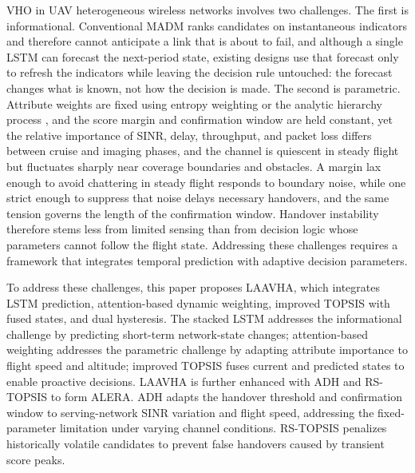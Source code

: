 \documentclass[preprint,12pt]{elsarticle}
\begin{document}
VHO in UAV heterogeneous wireless networks involves two challenges. The first is informational. Conventional MADM ranks candidates on instantaneous indicators and therefore cannot anticipate a link that is about to fail, and although a single LSTM can forecast the next-period state, existing designs use that forecast only to refresh the indicators while leaving the decision rule untouched: the forecast changes what is known, not how the decision is made. The second is parametric. Attribute weights are fixed using entropy weighting or the analytic hierarchy process \cite{ref12,ref13,ref14,ref15}, and the score margin and confirmation window are held constant, yet the relative importance of SINR, delay, throughput, and packet loss differs between cruise and imaging phases, and the channel is quiescent in steady flight but fluctuates sharply near coverage boundaries and obstacles. A margin lax enough to avoid chattering in steady flight responds to boundary noise, while one strict enough to suppress that noise delays necessary handovers, and the same tension governs the length of the confirmation window. Handover instability therefore stems less from limited sensing than from decision logic whose parameters cannot follow the flight state. Addressing these challenges requires a framework that integrates temporal prediction with adaptive decision parameters.

To address these challenges, this paper proposes LAAVHA, which integrates LSTM prediction, attention-based dynamic weighting, improved TOPSIS with fused states, and dual hysteresis. The stacked LSTM addresses the informational challenge by predicting short-term network-state changes; attention-based weighting addresses the parametric challenge by adapting attribute importance to flight speed and altitude; improved TOPSIS fuses current and predicted states to enable proactive decisions. LAAVHA is further enhanced with ADH and RS-TOPSIS to form ALERA. ADH adapts the handover threshold and confirmation window to serving-network SINR variation and flight speed, addressing the fixed-parameter limitation under varying channel conditions. RS-TOPSIS penalizes historically volatile candidates to prevent false handovers caused by transient score peaks.
\end{document}
